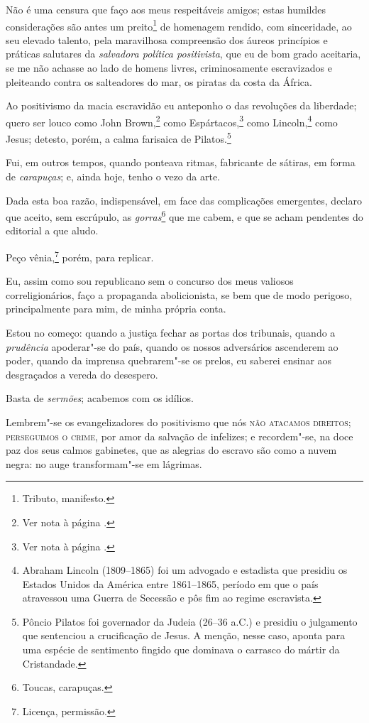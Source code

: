 Não é uma censura que faço aos meus respeitáveis amigos; estas humildes
considerações são antes um preito\footnote{Tributo, manifesto.} de
homenagem rendido, com sinceridade, ao seu elevado talento, pela
maravilhosa compreensão dos áureos princípios e práticas salutares da
\emph{salvadora política positivista}, que eu de bom grado aceitaria, se
me não achasse ao lado de homens livres, criminosamente escravizados e
pleiteando contra os salteadores do mar, os piratas da costa da África.

Ao positivismo da macia escravidão eu anteponho o das revoluções da
liberdade; quero ser louco como John
Brown,\footnote{Ver nota à página \pageref{brown}.} como
Espártacos,\footnote{Ver nota à página \pageref{espartacos}.} como Lincoln,\footnote{Abraham Lincoln (1809--1865) foi
  um advogado e estadista que presidiu os Estados Unidos da América
  entre 1861--1865, período em que o país atravessou uma Guerra de
  Secessão e pôs fim ao regime escravista.} como Jesus; detesto, porém,
a calma farisaica de Pilatos.\footnote{Pôncio Pilatos foi governador
  da Judeia (26--36 a.C.) e presidiu o julgamento que sentenciou a
  crucificação de Jesus. A menção, nesse caso, aponta para uma espécie
  de sentimento fingido que dominava o carrasco do mártir da
  Cristandade.}

Fui, em outros tempos, quando ponteava ritmas, fabricante de sátiras, em
forma de \emph{carapuças}; e, ainda hoje, tenho o vezo da arte.

Dada esta boa razão, indispensável, em face das complicações emergentes,
declaro que aceito, sem escrúpulo, as \emph{gorras}\footnote{Toucas,
  carapuças.} que me cabem, e que se acham pendentes do editorial a que
aludo.

Peço vênia,\footnote{Licença, permissão.} porém, para replicar.

Eu, assim como sou republicano sem o concurso dos meus valiosos
correligionários, faço a propaganda abolicionista, se bem que de modo
perigoso, principalmente para mim, de minha própria conta.

Estou no começo: quando a justiça fechar as portas dos tribunais, quando
a \emph{prudência} apoderar"-se do país, quando os nossos adversários
ascenderem ao poder, quando da imprensa quebrarem"-se os prelos, eu
saberei ensinar aos desgraçados a vereda do desespero.

Basta de \emph{sermões}; acabemos com os idílios.

Lembrem"-se os evangelizadores do positivismo que nós \textsc{não atacamos
direitos; perseguimos o crime}, por amor da salvação de infelizes; e
recordem"-se, na doce paz dos seus calmos gabinetes, que as alegrias do
escravo são como a nuvem negra: no auge transformam"-se em lágrimas.

